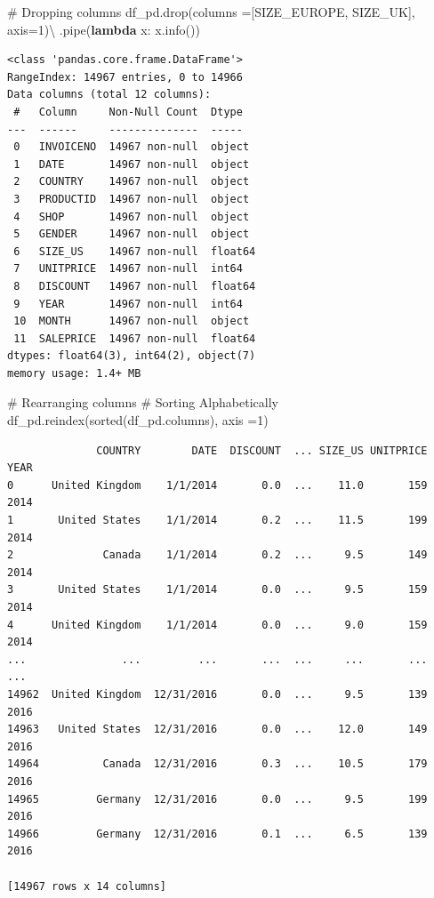 \documentclass[
  letterpaper,
  DIV=11,
  numbers=noendperiod]{scrreprt}
\newenvironment{Shaded}{\begin{snugshade}}{\end{snugshade}}
\newcommand{\BuiltInTok}[1]{\textcolor[rgb]{0.00,0.23,0.31}{#1}}
\newcommand{\CommentTok}[1]{\textcolor[rgb]{0.37,0.37,0.37}{#1}}
\newcommand{\DecValTok}[1]{\textcolor[rgb]{0.68,0.00,0.00}{#1}}
\newcommand{\KeywordTok}[1]{\textcolor[rgb]{0.00,0.23,0.31}{\textbf{#1}}}
\newcommand{\NormalTok}[1]{\textcolor[rgb]{0.00,0.23,0.31}{#1}}
\newcommand{\OperatorTok}[1]{\textcolor[rgb]{0.37,0.37,0.37}{#1}}
\newcommand{\StringTok}[1]{\textcolor[rgb]{0.13,0.47,0.30}{#1}}
\begin{document}
\begin{Shaded}
\begin{Highlighting}[]
\CommentTok{\# Dropping columns }
\NormalTok{df\_pd.drop(columns }\OperatorTok{=}\NormalTok{[}\StringTok{\textquotesingle{}SIZE\_EUROPE\textquotesingle{}}\NormalTok{, }\StringTok{\textquotesingle{}SIZE\_UK\textquotesingle{}}\NormalTok{], axis}\OperatorTok{=}\DecValTok{1}\NormalTok{)}\OperatorTok{\textbackslash{}}
\NormalTok{    .pipe(}\KeywordTok{lambda}\NormalTok{ x: x.info())}
\end{Highlighting}
\end{Shaded}

\begin{verbatim}
<class 'pandas.core.frame.DataFrame'>
RangeIndex: 14967 entries, 0 to 14966
Data columns (total 12 columns):
 #   Column     Non-Null Count  Dtype  
---  ------     --------------  -----  
 0   INVOICENO  14967 non-null  object 
 1   DATE       14967 non-null  object 
 2   COUNTRY    14967 non-null  object 
 3   PRODUCTID  14967 non-null  object 
 4   SHOP       14967 non-null  object 
 5   GENDER     14967 non-null  object 
 6   SIZE_US    14967 non-null  float64
 7   UNITPRICE  14967 non-null  int64  
 8   DISCOUNT   14967 non-null  float64
 9   YEAR       14967 non-null  int64  
 10  MONTH      14967 non-null  object 
 11  SALEPRICE  14967 non-null  float64
dtypes: float64(3), int64(2), object(7)
memory usage: 1.4+ MB
\end{verbatim}

\begin{Shaded}
\begin{Highlighting}[]
\CommentTok{\# Rearranging columns }
\CommentTok{\# Sorting Alphabetically}
\NormalTok{df\_pd.reindex(}\BuiltInTok{sorted}\NormalTok{(df\_pd.columns), axis }\OperatorTok{=}\DecValTok{1}\NormalTok{)}
\end{Highlighting}
\end{Shaded}

\begin{verbatim}
              COUNTRY        DATE  DISCOUNT  ... SIZE_US UNITPRICE  YEAR
0      United Kingdom    1/1/2014       0.0  ...    11.0       159  2014
1       United States    1/1/2014       0.2  ...    11.5       199  2014
2              Canada    1/1/2014       0.2  ...     9.5       149  2014
3       United States    1/1/2014       0.0  ...     9.5       159  2014
4      United Kingdom    1/1/2014       0.0  ...     9.0       159  2014
...               ...         ...       ...  ...     ...       ...   ...
14962  United Kingdom  12/31/2016       0.0  ...     9.5       139  2016
14963   United States  12/31/2016       0.0  ...    12.0       149  2016
14964          Canada  12/31/2016       0.3  ...    10.5       179  2016
14965         Germany  12/31/2016       0.0  ...     9.5       199  2016
14966         Germany  12/31/2016       0.1  ...     6.5       139  2016

[14967 rows x 14 columns]
\end{verbatim}
\end{document}

